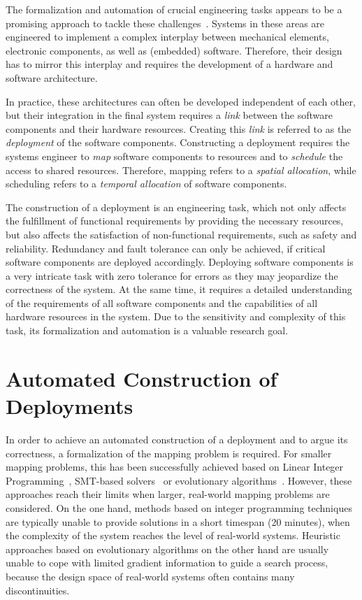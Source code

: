 \documentclass[conference]{IEEEtran}
\begin{document}
The formalization and automation of crucial engineering tasks appears to be a promising approach to tackle these challenges~\cite{Chapman2007,Hilbrich2015}.
Systems in these areas are engineered to implement a complex interplay between mechanical elements, electronic components, as well as (embedded) software.
Therefore, their design has to mirror this interplay and requires the development of a hardware and software architecture.

In practice, these architectures can often be developed independent of each other, but their integration in the final system requires a \emph{link} between the software components and their hardware resources.     
Creating this \emph{link} is referred to as the \emph{deployment} of the software components.
Constructing a deployment requires the systems engineer to \emph{map} software components to resources and to \emph{schedule} the access to shared resources.
Therefore, mapping refers to a \emph{spatial allocation}, while scheduling refers to a \emph{temporal allocation} of software components.

The construction of a deployment is an engineering task, which not only affects the fulfillment of functional requirements by providing the necessary resources, but also affects the satisfaction of non-functional requirements, such as safety and reliability.
Redundancy and fault tolerance can only be achieved, if critical software components are deployed accordingly.
Deploying software components is a very intricate task with zero tolerance for errors as they may jeopardize the correctness of the system.
At the same time, it requires a detailed understanding of the requirements of all software components and the capabilities of all hardware resources in the system.
Due to the sensitivity and complexity of this task, its formalization and automation is a valuable research goal.

\section{Automated Construction of Deployments}

In order to achieve an automated construction of a deployment and to argue its correctness, a formalization of the mapping problem is required.
For smaller mapping problems, this has been successfully achieved based on Linear Integer Programming~\cite{Damm2006, Kugele2009}, SMT-based solvers~\cite{Voss2013} or evolutionary algorithms~\cite{White2011}.
However, these approaches reach their limits when larger, real-world mapping problems are considered.
On the one hand, methods based on integer programming techniques are typically unable to provide solutions in a short timespan (20 minutes), when the complexity of the system reaches the level of real-world systems.
Heuristic approaches based on evolutionary algorithms on the other hand are usually unable to cope with limited gradient information to guide a search process, because the design space of real-world systems often contains many discontinuities. 
\end{document}
